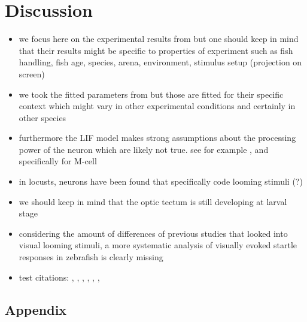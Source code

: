 \documentclass[a4paper,10pt,hidelinks]{scrreprt}
\begin{document}
	\chapter{Discussion}
	\begin{itemize}
		\item we focus here on the experimental results from 
		\cite{Bhattacharyya2017} but one should keep in mind that their results 
		might be specific to properties of experiment such as fish handling, 
		fish age, species, arena, environment, stimulus setup (projection on 
		screen)
		\item we took the fitted parameters from \cite{Koyama2016} but those are fitted for their 
		specific context which might vary in other experimental conditions and certainly in other 
		species
		\item furthermore the LIF model makes strong assumptions about the processing power of the 
		neuron which are likely not true. see for example \cite{Koch2000}, and specifically for 
		M-cell \cite{Medan2017}
		\item in locusts, neurons have been found that specifically code looming stimuli 
		\cite{Hatsopoulos1995} (?)
		\item we should keep in mind that the optic tectum is still developing at larval stage 
		\cite{Avitan2017}
		\item considering the amount of differences of previous studies that looked into visual 
		looming stimuli, a more systematic analysis of visually evoked startle responses in 
		zebrafish is clearly missing
		\item test citations: \cite{Severi2014}, \cite{Sarvestani2013}, \cite{Romano2015}, 
		\cite{Parrish2002}, \cite{Moeller1989}, \cite{Howe2013}, \cite{DelBene2010}
	\end{itemize}
	\newpage
	\printbibliography[heading=bibintoc]
	
	\newpage
	\appendix
	\section{Appendix}

	
\end{document}
